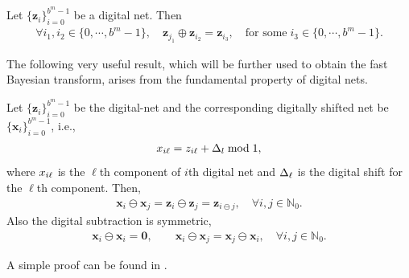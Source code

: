 \documentclass[graybox,footinfo]{svmult}
\let\vec\relax
\newcommand{\bm}[1]{\boldsymbol{#1}}
\newcommand{\naturals}{\mathbb{N}}
\newcommand{\vx}{\bm{x}}
\newcommand{\vz}{\bm{z}}
\newcommand{\mG}{\mathsf{G}}
\begin{document}
Let $\{\vz_i\}_{i=0}^{b^m-1}$ be a digital net. Then
\begin{align*}
\forall i_1, i_2 \in \{0,\cdots,b^m-1\}, \quad \vz_{j_1} \oplus \vz_{i_2} = \vz_{i_3}, \quad \text{for some} \; i_3 \in \{0,\cdots,b^m-1\}.
\end{align*}

The following very useful result, which will be further used to obtain the fast Bayesian transform, arises from the fundamental property of digital nets.

\begin{lemma}
	\label{lemma:digital_net_prop}
	Let $\{\vz_i\}_{i=0}^{b^{m}-1}$ be the digital-net and the corresponding digitally shifted net be $\{\vx_i\}_{i=0}^{b^{m}-1}$, i.e.,
	\begin{align*}
	\vec{x}_{i \ell} = \vec{z}_{i \ell} + \vec{\Delta}_l \bmod 1,
	\end{align*}
	where $\vec{x}_{i \ell}$ is the $\ell$th component of $i$th digital net and $\vec{\Delta}_{\ell}$ is the digital shift for the $\ell$th component. 
	Then,
	\begin{align}
	\label{eqn:digital_shift_prop}
	\vx_i \ominus \vx_j = \vz_i \ominus \vz_j = \vz_{i \ominus j}, \quad \forall i,j \in \naturals_0. 
	\end{align}
	Also the digital subtraction is symmetric,
	\begin{align}
	\label{eqn:digital_net_symmetric_prop}
	\vx_i \ominus \vx_i = \boldsymbol{ 0}, \qquad 
	\vx_i \ominus \vx_j = \vx_j \ominus \vx_i, \quad \forall i,j \in \naturals_0.
	\end{align}
\end{lemma}
A simple proof can be found in \cite{JagThesis19a}.

\end{document}

